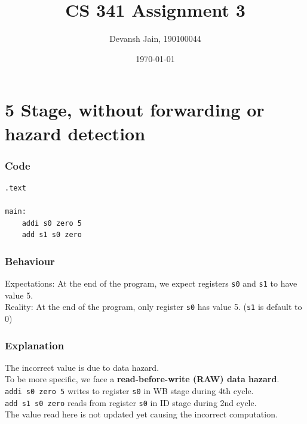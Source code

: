 \documentclass[12pt, fleqn]{article}
\title{CS 341 Assignment 3}
\author{Devansh Jain, 190100044}
\date{\today}
\begin{document}
\maketitle
\tableofcontents
\thispagestyle{empty}
\setcounter{page}{0}

\newpage
\section{5 Stage, without forwarding or hazard detection}

\subsubsection*{Code}
\begin{verbatim}
.text

main:
    addi s0 zero 5
    add s1 s0 zero
\end{verbatim}

\subsubsection*{Behaviour}
Expectations: At the end of the program, we expect registers \verb!s0! and \verb!s1! to have value 5. \\
Reality: At the end of the program, only register \verb!s0! has value 5. (\verb!s1! is default to 0)

\subsubsection*{Explanation}
The incorrect value is due to data hazard. \\
To be more specific, we face a \textbf{read-before-write (RAW) data hazard}. \\
\verb!addi s0 zero 5! writes to register \verb!s0! in WB stage during 4th cycle. \\
\verb!add s1 s0 zero! reads from register \verb!s0! in ID stage during 2nd cycle. \\
The value read here is not updated yet causing the incorrect computation.
\end{document}
